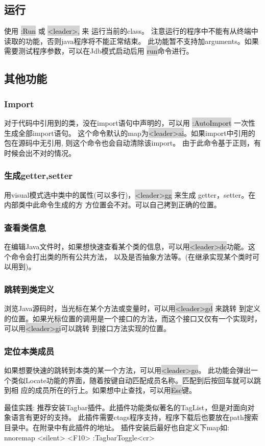\documentclass[oneside,openany]{book}
\begin{document}
\subsection{运行}
    使用 \colorbox{lightgray}{:Run} 或 \colorbox{lightgray}{<leader>,} 来 运行当前的class。
注意运行的程序中不能有从终端中读取的功能，否则java程序将不能正常结束。
此功能暂不支持加arguments。如果需要测试程序参数，可以在Jdb模式启动后用 \colorbox{lightgray}{run}命令进行。

\subsection{其他功能}

\subsubsection{Import}
    对于代码中引用到的类，没在import语句中声明的，可以用 \colorbox{lightgray}{:AutoImport} 一次性生成全部import语句。 
这个命令默认的map为\colorbox{lightgray}{<leader>ai}。如果import中引用的包在源码中无引用, 则这个命令也会自动清除该import。
由于此命令基于正则，有时候会出不对的情况。

\subsubsection{生成getter,setter}
    用visual模式选中类中的属性(可以多行)，\colorbox{lightgray}{<leader>gg} 来生成 getter，setter。在内部类中此命令生成的方
方位置会不对。可以自己拷到正确的位置。

\subsubsection{查看类信息}
   在编辑Java文件时，如果想快速查看某个类的信息，可以用\colorbox{lightgray}{<leader>dc}功能。这个命令会打出类的所有公共方法，
以及是否抽象方法等。(在继承实现某个类时可以用到)。

\subsubsection{跳转到类定义}
浏览Java源码时，当光标在某个方法或变量时，可以用\colorbox{lightgray}{<leader>gd} 来跳转
到定义的位置。如果光标位置的调用是一个接口的方法，而这个接口又仅有一个实现时，可以用\colorbox{lightgray}{<leader>gi}可以跳转
到接口方法实现的位置。

\subsubsection{定位本类成员}
  如果想要快速的跳转到本类的某一个方法，可以用\colorbox{lightgray}{<leader>go}。
  此功能会弹出一个类似Locate功能的界面，随着按键自动匹配成员名称。匹配到后按回车就可以跳到相
  应的成员所在的行上。如果想中止查找，可以用\colorbox{lightgray}{Esc}键。
  \begin{mdframed}[style=BestPracticeFrame]
    最佳实践: 推荐安装Tagbar插件。此插件功能类似著名的TagList，但是对面向对象语言有更好的支持。
    此插件需要ctags程序支持，程序下载后也要放在path搜索目录中。在附录中有此插件的地址。
    插件安装后最好也自定义下map如:
      nnoremap <silent> <F10> :TagbarToggle<cr>
  \end{mdframed}
\end{document}
